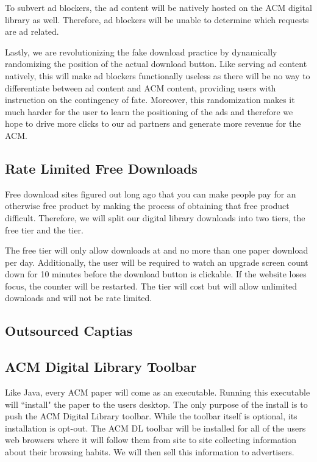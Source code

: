 To subvert ad blockers, the ad content will be natively hosted on the ACM
digital library as well.
Therefore, ad blockers will be unable to determine which requests are ad
related.

Lastly, we are revolutionizing the fake download practice by dynamically
randomizing the position of the actual download button.
Like serving ad content natively, this will make ad blockers functionally
useless as there will be no way to differentiate between ad content and ACM
content, providing users with instruction on the contingency of fate.
Moreover, this randomization makes it much harder for the user to learn the
positioning of the ads and therefore we hope to drive more clicks to our ad
partners and generate more revenue for the ACM.

\subsection{Rate Limited Free Downloads}
Free download sites figured out long ago that you can make people pay for an
otherwise free product by making the process of obtaining that free product
difficult.
Therefore, we will split our digital library downloads into two tiers, the free
tier and the \premium tier.

The free tier will only allow downloads at  and no more than one
paper download per day.
Additionally, the user will be required to watch an upgrade screen
 count down for 10 minutes before the download button is
clickable.
If the website loses focus, the counter will be restarted.
The \premium tier will cost  but will allow unlimited downloads and
will not be rate limited.


\subsection{Outsourced Captias}

\subsection{ACM Digital Library Toolbar}
Like Java, every ACM paper will come as an executable.
Running this executable will ``install" the paper to the users desktop.
The only purpose of the install is to push the ACM Digital Library toolbar.
While the toolbar itself is optional, its installation is opt-out.
The ACM DL toolbar will be installed for all of the users web browsers where it
will follow them from site to site collecting information about their browsing
habits.
We will then sell this information to advertisers.

